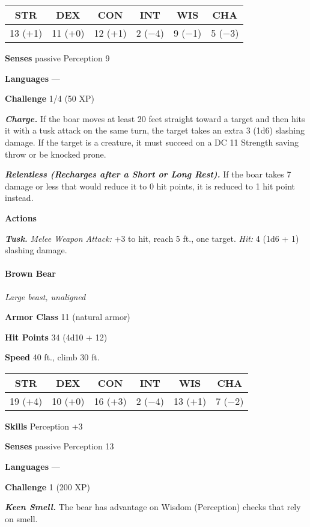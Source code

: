\documentclass[
]{article}
\begin{document}
\begin{longtable}[]{@{}cccccc@{}}
\toprule
STR & DEX & CON & INT & WIS & CHA\tabularnewline
\midrule
\endhead
13 (+1) & 11 (+0) & 12 (+1) & 2 (−4) & 9 (−1) & 5 (−3)\tabularnewline
\bottomrule
\end{longtable}

\textbf{Senses} passive Perception 9

\textbf{Languages} ---

\textbf{Challenge} 1/4 (50 XP)

\emph{\textbf{Charge.}} If the boar moves at least 20 feet straight
toward a target and then hits it with a tusk attack on the same turn,
the target takes an extra 3 (1d6) slashing damage. If the target is a
creature, it must succeed on a DC 11 Strength saving throw or be knocked
prone.

\emph{\textbf{Relentless (Recharges after a Short or Long Rest).}} If
the boar takes 7 damage or less that would reduce it to 0 hit points, it
is reduced to 1 hit point instead.

\textbf{Actions}

\emph{\textbf{Tusk.}} \emph{Melee Weapon Attack:} +3 to hit, reach 5
ft., one target. \emph{Hit:} 4 (1d6 + 1) slashing damage.

\hypertarget{brown-bear}{%
\paragraph{Brown Bear}\label{brown-bear}}

\emph{Large beast, unaligned}

\textbf{Armor Class} 11 (natural armor)

\textbf{Hit Points} 34 (4d10 + 12)

\textbf{Speed} 40 ft., climb 30 ft.

\begin{longtable}[]{@{}cccccc@{}}
\toprule
STR & DEX & CON & INT & WIS & CHA\tabularnewline
\midrule
\endhead
19 (+4) & 10 (+0) & 16 (+3) & 2 (−4) & 13 (+1) & 7 (−2)\tabularnewline
\bottomrule
\end{longtable}

\textbf{Skills} Perception +3

\textbf{Senses} passive Perception 13

\textbf{Languages} ---

\textbf{Challenge} 1 (200 XP)

\emph{\textbf{Keen Smell.}} The bear has advantage on Wisdom
(Perception) checks that rely on smell.
\end{document}
